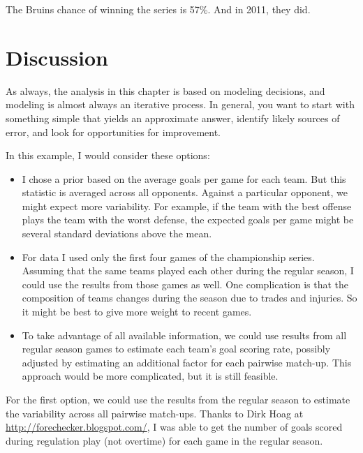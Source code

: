 \documentclass[12pt]{book}
\begin{document}
The Bruins chance of winning the series is 57\%.  And in 2011,
they did.


\section{Discussion}

As always, the analysis in this chapter is based on modeling decisions,
and modeling is almost always an iterative process.  In general,
you want to start with something simple that yields an approximate
answer, identify likely sources of error, and look for opportunities
for improvement.

In this example, I would consider these options:

\begin{itemize}

\item I chose a prior based on the average goals per game for each
  team.  But this statistic is averaged across all opponents.  Against
  a particular opponent, we might expect more variability.  For
  example, if the team with the best offense plays the team with the
  worst defense, the expected goals per game might be several standard
  deviations above the mean.

\item For data I used only the first four games of the championship
  series.  Assuming that the same teams played each other during the
  regular season, I could use the results from those games as well.
  One complication is that the composition of teams changes during
  the season due to trades and injuries.  So it might be best to
  give more weight to recent games.

\item To take advantage of all available information, we could
  use results from all regular season games to estimate each team's
  goal scoring rate, possibly adjusted by estimating
  an additional factor for each pairwise match-up.  This approach
  would be more complicated, but it is still feasible.

\end{itemize}

For the first option, we could use the results from the regular season
to estimate the variability across all pairwise match-ups.  Thanks to
Dirk Hoag at \url{http://forechecker.blogspot.com/}, I was able to get
the number of goals scored during regulation play (not overtime) for
each game in the regular season.
\end{document}
